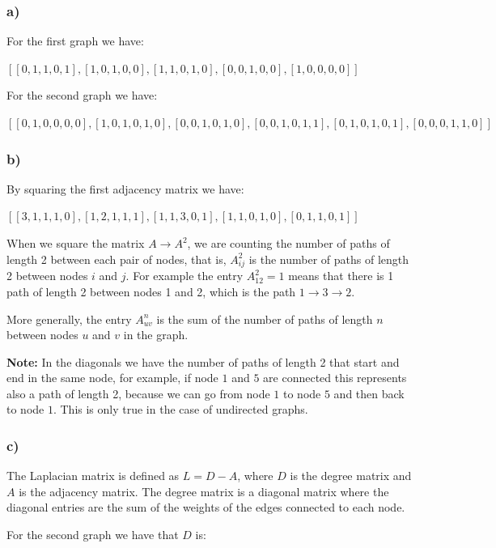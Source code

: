 \documentclass{article}
\begin{document}
\subsubsection*{a)}

For the first graph we have:

$[
[0, 1, 1, 0, 1],
[1, 0, 1, 0, 0],
[1, 1, 0, 1, 0],
[0, 0, 1, 0, 0],
[1, 0, 0, 0, 0]]$

For the second graph we have:

$[
[0, 1, 0, 0, 0, 0],
[1, 0, 1, 0, 1, 0],
[0, 0, 1, 0, 1, 0],
[0, 0, 1, 0, 1, 1],
[0, 1, 0, 1, 0, 1], 
[0, 0, 0, 1, 1, 0]]$

\subsubsection*{b)}

By squaring the first adjacency matrix we have:

$[
[3, 1, 1, 1, 0],
[1, 2, 1, 1, 1],
[1, 1, 3, 0, 1],
[1, 1, 0, 1, 0],
[0, 1, 1, 0, 1]]$

When we square the matrix $A \rightarrow A^2$, we are counting the number of paths of length 2 between each pair of nodes,
that is, $A_{ij}^2$ is the number of paths of length 2 between nodes $i$ and $j$.
For example the entry $A_{12}^2 = 1$ means that there is 1 path of length 2 between nodes 1 and 2, which is the path
$1 \rightarrow 3 \rightarrow 2$.

More generally, the entry $A_{uv}^n$ is the sum of the number of paths of length $n$ between nodes $u$ and $v$ in the graph.

\textbf{Note:} In the diagonals we have the number of paths of length 2 that start and end in the same node, for example,
if node $1$ and $5$ are connected this represents also a path of length 2, because we can go from node $1$ to node $5$ and
then back to node $1$. This is only true in the case of undirected graphs.

\subsubsection*{c)}

The Laplacian matrix is defined as $L = D - A$, where $D$ is the degree matrix and $A$ is the adjacency matrix.
The degree matrix is a diagonal matrix where the diagonal entries are the sum of the weights of the edges connected to each node.

For the second graph we have that $D$ is:
\end{document}
